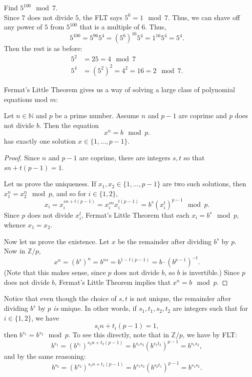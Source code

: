 \documentclass[11pt,dvipsnames]{book}
\numberwithin{figure}{section} %
\numberwithin{table}{section} %
\begin{document}
\begin{example}
Find $5^{100}\mod 7$. \\

Since $7$ does not divide $5$, the FLT says $5^{6} = 1\mod 7$. Thus, we can shave off any power of $5$ from $5^{100}$ that is a multiple of $6$. Thus,
\[
5^{100} = 5^{96}5^{4}=(5^{6})^{16}5^{4} = 1^{16}5^{4}= 5^{4}.
\]
Then the rest is as before:
\begin{align*}
5^{2} & =25 = 4\mod 7\\
5^{4} & =(5^{2})^{2} = 4^{2}=16 = 2\mod 7.
\end{align*}
\end{example}

Fermat's Little Theorem gives us a way of solving a large class of polynomial equations mod $m$:

\begin{theorem}
\label{t:x^n=bmodp}
Let $n\in\mathbb{N}$ and $p$ be a prime number. Assume $n$ and $p-1$ are coprime and $p$ does not divide $b$. Then the equation
\begin{equation}
\label{e:x^n=bmodp}
x^{n} = b\mod p.
\end{equation}
has exactly one solution $x\in \{1,\dots,p-1\}$.
\end{theorem}

\begin{proof}
Since $n$ and $p-1$ are coprime, there are integers $s,t$ so that $sn+t(p-1)=1$.

Let us prove the uniqueness.
If $x_1,x_2 \in \{1,\dots,p-1\}$ are two such solutions, then $x_1^n=x_2^n \mod p$, and so for $i \in \{1,2\}$,
\[
x_i = x_i^{sn+t(p-1)} = x_i^{sn}x_i^{t(p-1)} = b^s(x_i^t)^{p-1} \mod p.
\]
Since $p$ does not divide $x_i^t$, Fermat's Little Theorem that each $x_i = b^s \mod p$, whence $x_1=x_2$.

Now let us prove the existence.
Let $x$ be the remainder after dividing $b^s$ by $p$.
Now in $\mathbb{Z}/p$,
\[
x^{n}  = (b^{s})^{n}=b^{ns}  = b^{1-t(p-1)}=b\cdot (b^{p-1})^{-t}.\]
(Note that this makes sense, since $p$ does not divide $b$, so $b$ is invertible.)
Since $p$ does not divide $b$, Fermat's Little Theorem implies that $x^n = b \mod p$.
\end{proof}

Notice that even though the choice of $s, t$ is not unique, the remainder after dividing $b^s$ by $p$ \emph{is} unique.
In other words, if $s_1,t_1,s_2,t_2$ are integers such that for $i \in \{1,2\}$, we have
\[
s_in+t_i(p-1)=1,
\]
then $b^{s_1} = b^{s_2} \mod p$.
To see this directly, note that in $\mathbb{Z}/p$, we have by FLT:
\[
b^{s_1} = (b^{s_1})^{s_2n+t_2(p-1)} = b^{s_1s_2}(b^{s_1t_2})^{p-1}=b^{s_1s_2},
\]
and by the same reasoning:
\[
b^{s_2} = (b^{s_2})^{s_1n+t_1(p-1)} = b^{s_1s_2}(b^{s_2t_1})^{p-1}=b^{s_1s_2}.
\]
\end{document}
